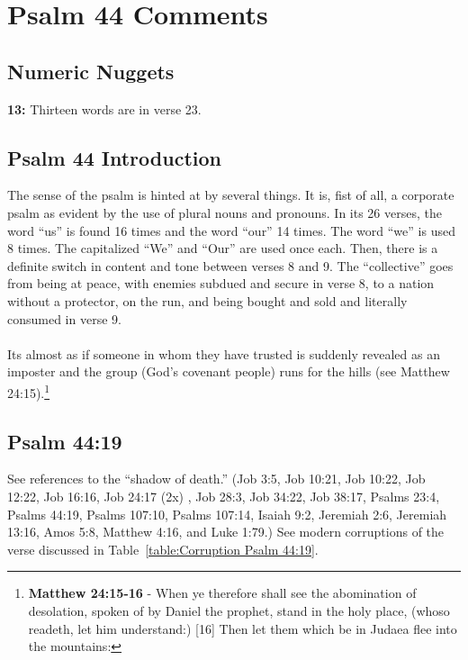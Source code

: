 \section{Psalm 44 Comments}

\subsection{Numeric Nuggets}
\textbf{13: } Thirteen words are in verse 23.

\subsection{Psalm 44 Introduction}
The sense of the psalm is hinted at by several things.  It is, fist of all, a corporate psalm as evident by the use of plural nouns and pronouns. In its 26 verses, the word ``us'' is found 16 times and the word ``our'' 14 times. The word ``we'' is used 8 times. The capitalized ``We'' and ``Our'' are used once each. Then, there is a definite switch in content and tone between verses 8 and 9.  The ``collective'' goes from being at peace, with enemies subdued and secure in verse 8, to a  nation without a protector, on the run, and being bought and sold and literally consumed in verse 9.\\
\\
\noindent Its almost as if someone in whom they have trusted is suddenly revealed as an imposter and the group (God's covenant people) runs for the hills (see  Matthew 24:15).\footnote{\textbf{Matthew 24:15-16} -  \textcolor[cmyk]{0, 0.85. 0.70. 0.23}{When ye therefore shall see the abomination of desolation, spoken of by Daniel the prophet, stand in the holy place, (whoso readeth, let him understand:)} [16]  \textcolor[cmyk]{0, 0.85. 0.70. 0.23}{Then let them which be in Judaea flee into the mountains:} }

\subsection{Psalm 44:19}
See references to the ``shadow of death.'' (Job 3:5, Job 10:21, Job 10:22, Job 12:22, Job 16:16, Job 24:17 (2x) , Job 28:3, Job 34:22, Job 38:17, Psalms 23:4, Psalms 44:19, Psalms 107:10, Psalms 107:14,  Isaiah 9:2, Jeremiah 2:6, Jeremiah 13:16, Amos 5:8, Matthew 4:16, and Luke 1:79.) See modern corruptions of the verse discussed in Table~\ref{table:Corruption Psalm 44:19}.





